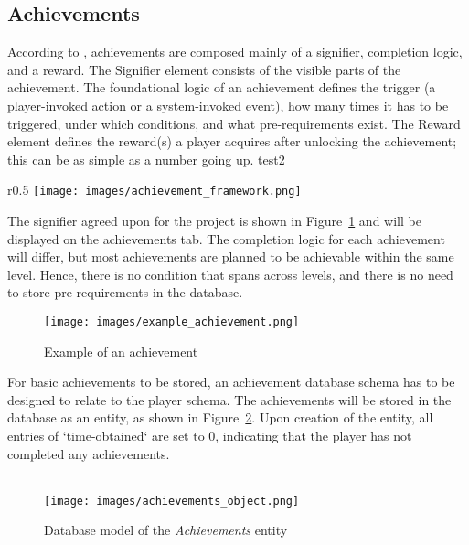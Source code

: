 \subsection{Achievements}

According to \cite{hamari2011framework}, achievements are composed mainly of a signifier, completion logic, and a reward. The Signifier element consists of the visible parts of the achievement. The foundational logic of an achievement defines the trigger (a player-invoked action or a system-invoked event), how many times it has to be triggered, under which conditions, and what pre-requirements exist. The Reward element defines the reward(s) a player acquires after unlocking the achievement; this can be as simple as a number going up. test2

\begin{wrapfigure}[16]{r}{0.5\textwidth}
    \centering
    \texttt{[image: images/achievement\_framework.png]}
    \caption{Achievement Framework from \cite{hamari2011framework}}
    \label{fig:achievement_framework}
\end{wrapfigure}

The signifier agreed upon for the project is shown in Figure~\ref{fig:achievements} and will be displayed on the achievements tab. The completion logic for each achievement will differ, but most achievements are planned to be achievable within the same level. Hence, there is no condition that spans across levels, and there is no need to store pre-requirements in the database.

\begin{figure}[H]
    \captionsetup{justification=raggedright,singlelinecheck=false}
    \texttt{[image: images/example\_achievement.png]}
    \caption{Example of an achievement}
    \label{fig:achievements}
\end{figure}

For basic achievements to be stored, an achievement database schema has to be designed to relate to the player schema. The achievements will be stored in the database as an entity, as shown in Figure~\ref{fig:achievements_object}. Upon creation of the entity, all entries of `time-obtained` are set to 0, indicating that the player has not completed any achievements.
\\\\
\begin{figure}[H]
    \centering
    \texttt{[image: images/achievements\_object.png]}
    \caption{Database model of the \textit{Achievements} entity}
    \label{fig:achievements_object}
\end{figure}

